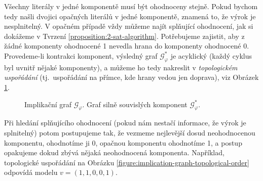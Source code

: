 Všechny literály v jedné komponentě musí být ohodnoceny stejně. Pokud bychom tedy našli dvojici opačných literálů v jedné komponentě, znamená to, že výrok je nesplnitelný. V opačném případě vždy můžeme najít splňující ohodnocení, jak si dokážeme v Tvrzení \ref{proposition:2-sat-algorithm}. Potřebujeme zajistit, aby z žádné komponenty ohodnocené 1 nevedla hrana do komponenty ohodnocené 0. Provedeme-li kontrakci komponent, výsledný graf $\mathcal G_\varphi^\ast$ je acyklický (každý cyklus byl uvnitř nějaké komponenty), a můžeme ho tedy nakreslit v \emph{topologickém uspořádání} (tj.\ uspořádání na přímce, kde hrany vedou jen doprava), viz Obrázek \ref{figure:implication-graph-components}. 

\begin{figure} 
    \small   
    \centering
        \caption{Implikační graf $\mathcal G_\varphi$. Graf silně souvislých komponent $\mathcal G_\varphi^\ast$.}\label{figure:implication-graph-components}
\end{figure}

Při hledání splňujícího ohodnocení (pokud nám nestačí informace, že výrok je splnitelný) potom postupujeme tak, že vezmeme nejlevější dosud neohodnocenou komponentu, ohodnotíme ji 0, opačnou komponentu ohodnotíme 1, a postup opakujeme dokud zbývá nějaká neohodnocená komponenta. Například, topologické uspořádání na Obrázku \ref{figure:implication-graph-topological-order} odpovídá modelu $v=(1,1,0,0,1)$.

